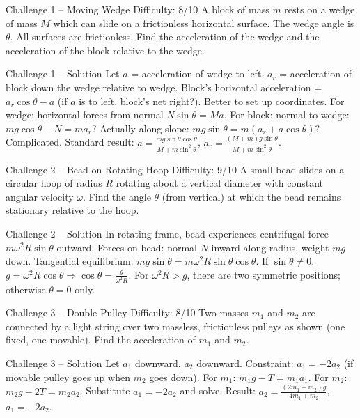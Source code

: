 \documentclass[11pt]{beamer}
\begin{document}
\begin{frame}[shrink=15]{Challenge 1 – Moving Wedge \hfill Difficulty: 8/10}
A block of mass $m$ rests on a wedge of mass $M$ which can slide on a frictionless horizontal surface. The wedge angle is $\theta$. All surfaces are frictionless. Find the acceleration of the wedge and the acceleration of the block relative to the wedge.
\end{frame}

\begin{frame}{Challenge 1 – Solution}
Let $a$ = acceleration of wedge to left, $a_r$ = acceleration of block down the wedge relative to wedge. Block's horizontal acceleration = $a_r\cos\theta - a$ (if $a$ is to left, block's net right?). Better to set up coordinates.
For wedge: horizontal forces from normal $N\sin\theta = M a$.
For block: normal to wedge: $mg\cos\theta - N = m a_r$? Actually along slope: $mg\sin\theta = m(a_r + a\cos\theta)$? Complicated.
Standard result: $a = \frac{mg\sin\theta\cos\theta}{M + m\sin^2\theta}$, $a_r = \frac{(M+m)g\sin\theta}{M + m\sin^2\theta}$.
\end{frame}

\begin{frame}[shrink=15]{Challenge 2 – Bead on Rotating Hoop \hfill Difficulty: 9/10}
A small bead slides on a circular hoop of radius $R$ rotating about a vertical diameter with constant angular velocity $\omega$. Find the angle $\theta$ (from vertical) at which the bead remains stationary relative to the hoop.
\end{frame}

\begin{frame}{Challenge 2 – Solution}
In rotating frame, bead experiences centrifugal force $m\omega^2 R\sin\theta$ outward. Forces on bead: normal $N$ inward along radius, weight $mg$ down. Tangential equilibrium: $mg\sin\theta = m\omega^2 R\sin\theta\cos\theta$. If $\sin\theta \neq 0$, $g = \omega^2 R\cos\theta \Rightarrow \cos\theta = \frac{g}{\omega^2 R}$. For $\omega^2 R > g$, there are two symmetric positions; otherwise $\theta=0$ only.
\end{frame}

\begin{frame}[shrink=15]{Challenge 3 – Double Pulley \hfill Difficulty: 8/10}
Two masses $m_1$ and $m_2$ are connected by a light string over two massless, frictionless pulleys as shown (one fixed, one movable). Find the acceleration of $m_1$ and $m_2$.
\end{frame}

\begin{frame}{Challenge 3 – Solution}
Let $a_1$ downward, $a_2$ downward. Constraint: $a_1 = -2a_2$ (if movable pulley goes up when $m_2$ goes down). For $m_1$: $m_1g - T = m_1a_1$. For $m_2$: $m_2g - 2T = m_2a_2$. Substitute $a_1 = -2a_2$ and solve. Result: $a_2 = \frac{(2m_1 - m_2)g}{4m_1 + m_2}$, $a_1 = -2a_2$.
\end{frame}
\end{document}
